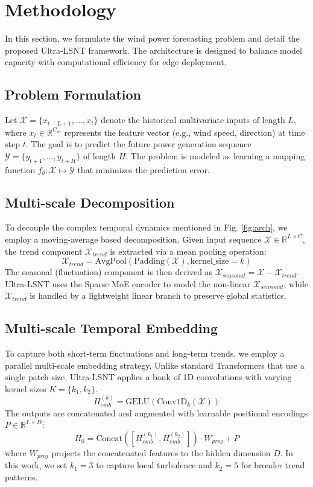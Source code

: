 \documentclass[a4paper,fleqn]{cas-sc}
\begin{document}
\section{Methodology}
In this section, we formulate the wind power forecasting problem and detail the proposed Ultra-LSNT framework. The architecture is designed to balance model capacity with computational efficiency for edge deployment.

\subsection{Problem Formulation}
Let $\mathcal{X} = \{x_{t-L+1}, \dots, x_t\}$ denote the historical multivariate inputs of length $L$, where $x_t \in \mathbb{R}^{C_{in}}$ represents the feature vector (e.g., wind speed, direction) at time step $t$. The goal is to predict the future power generation sequence $\mathcal{Y} = \{y_{t+1}, \dots, y_{t+H}\}$ of length $H$. The problem is modeled as learning a mapping function $f_\theta: \mathcal{X} \mapsto \mathcal{Y}$ that minimizes the prediction error.

\subsection{Multi-scale Decomposition}
To decouple the complex temporal dynamics mentioned in Fig. \ref{fig:arch}, we employ a moving-average based decomposition. Given input sequence $\mathcal{X} \in \mathbb{R}^{L \times C}$, the trend component $\mathcal{X}_{trend}$ is extracted via a mean pooling operation:
\begin{equation}
    \mathcal{X}_{trend} = \text{AvgPool}(\text{Padding}(\mathcal{X}), \text{kernel\_size}=k)
\end{equation}
The seasonal (fluctuation) component is then derived as $\mathcal{X}_{seasonal} = \mathcal{X} - \mathcal{X}_{trend}$. Ultra-LSNT uses the Sparse MoE encoder to model the non-linear $\mathcal{X}_{seasonal}$, while $\mathcal{X}_{trend}$ is handled by a lightweight linear branch to preserve global statistics.

\subsection{Multi-scale Temporal Embedding}
To capture both short-term fluctuations and long-term trends, we employ a parallel multi-scale embedding strategy. Unlike standard Transformers that use a single patch size, Ultra-LSNT applies a bank of 1D convolutions with varying kernel sizes $K=\{k_1, k_2\}$.
\begin{equation}
    H_{emb}^{(k)} = \text{GELU}(\text{Conv1D}_k(\mathcal{X}))
\end{equation}
The outputs are concatenated and augmented with learnable positional encodings $P \in \mathbb{R}^{L \times D}$:
\begin{equation}
    H_0 = \text{Concat}([H_{emb}^{(k_1)}, H_{emb}^{(k_2)}]) \cdot W_{proj} + P
\end{equation}
where $W_{proj}$ projects the concatenated features to the hidden dimension $D$. In this work, we set $k_1=3$ to capture local turbulence and $k_2=5$ for broader trend patterns.
\end{document}
